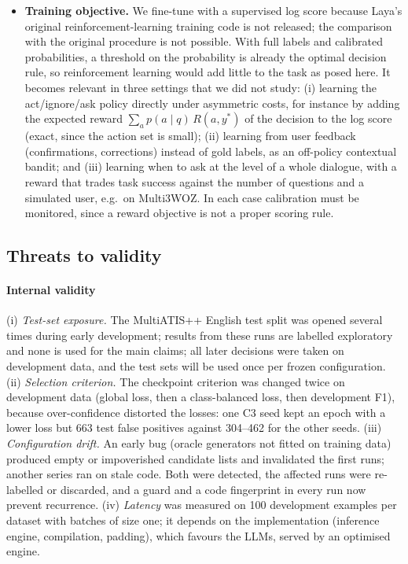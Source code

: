 \begin{itemize}
  \item \textbf{Training objective.} We fine-tune with a supervised log score because Laya's original reinforcement-learning training code is not released; the comparison with the original procedure is not possible. With full labels and calibrated probabilities, a threshold on the probability is already the optimal decision rule, so reinforcement learning would add little to the task as posed here. It becomes relevant in three settings that we did not study: (i) learning the act/ignore/ask policy directly under asymmetric costs, for instance by adding the expected reward $\sum_a p(a \mid q)\,R(a, y^{*})$ of the decision to the log score (exact, since the action set is small); (ii) learning from user feedback (confirmations, corrections) instead of gold labels, as an off-policy contextual bandit; and (iii) learning when to ask at the level of a whole dialogue, with a reward that trades task success against the number of questions and a simulated user, e.g.\ on Multi3WOZ. In each case calibration must be monitored, since a reward objective is not a proper scoring rule.
\end{itemize}

\subsection{Threats to validity}
\label{sec:threats}

\paragraph{Internal validity} (i) \emph{Test-set exposure.} The MultiATIS++ English test split was opened several times during early development; results from these runs are labelled exploratory and none is used for the main claims; all later decisions were taken on development data, and the test sets will be used once per frozen configuration. (ii) \emph{Selection criterion.} The checkpoint criterion was changed twice on development data (global loss, then a class-balanced loss, then development F1), because over-confidence distorted the losses: one C3 seed kept an epoch with a lower loss but 663 test false positives against 304--462 for the other seeds. (iii) \emph{Configuration drift.} An early bug (oracle generators not fitted on training data) produced empty or impoverished candidate lists and invalidated the first runs; another series ran on stale code. Both were detected, the affected runs were re-labelled or discarded, and a guard and a code fingerprint in every run now prevent recurrence. (iv) \emph{Latency} was measured on 100 development examples per dataset with batches of size one; it depends on the implementation (inference engine, compilation, padding), which favours the LLMs, served by an optimised engine.

